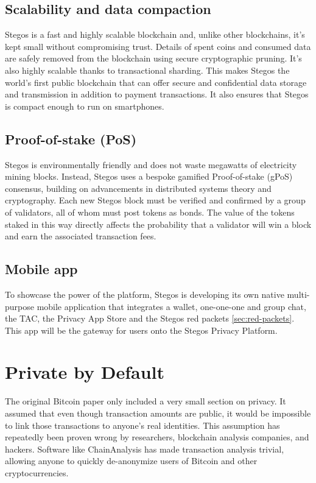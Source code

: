 \documentclass[8pt,fleqn,openany]{book}
\begin{document}
\subsection{Scalability and data compaction}
Stegos is a fast and highly scalable blockchain and, unlike other blockchains, it’s kept small without compromising trust. Details of spent coins and consumed data are safely removed from the blockchain using secure cryptographic pruning. It's also highly scalable thanks to transactional sharding. This makes Stegos the world’s first public blockchain that can offer secure and confidential data storage and transmission in addition to payment transactions. It also ensures that Stegos is compact enough to run on smartphones.

\subsection{Proof-of-stake (PoS)}
Stegos is environmentally friendly and does not waste megawatts of electricity mining blocks. Instead, Stegos uses a bespoke gamified Proof-of-stake (gPoS) consensus, building on advancements in distributed systems theory and cryptography. Each new Stegos block must be verified and confirmed by a group of validators, all of whom must post tokens as bonds. The value of the tokens staked in this way directly affects the probability that a validator will win a block and earn the associated transaction fees.

\subsection{Mobile app}
To showcase the power of the platform, Stegos is developing its own native multi-purpose mobile application that integrates a wallet, one-one-one and group chat, the TAC, the Privacy App Store and the Stegos red packets \ref{sec:red-packets}. This app will be the gateway for users onto the Stegos Privacy Platform.


\section{Private by Default}
The original Bitcoin paper only included a very small section on privacy\cite{c1}. It assumed that even though transaction amounts are public, it would be impossible to link those transactions to anyone’s real identities. This assumption has repeatedly been proven wrong by researchers, blockchain analysis companies, and hackers. Software like ChainAnalysis has made transaction analysis trivial, allowing anyone to quickly de-anonymize users of Bitcoin and other cryptocurrencies.
\end{document}
